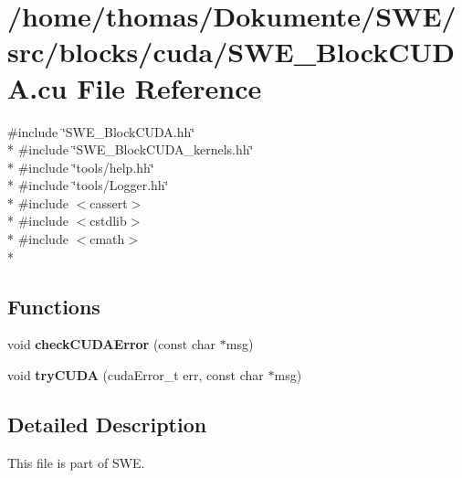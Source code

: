 \hypertarget{SWE__BlockCUDA_8cu}{\section{/home/thomas/\-Dokumente/\-S\-W\-E/src/blocks/cuda/\-S\-W\-E\-\_\-\-Block\-C\-U\-D\-A.cu File Reference}
\label{SWE__BlockCUDA_8cu}
}
{\ttfamily \#include \char`\"{}S\-W\-E\-\_\-\-Block\-C\-U\-D\-A.\-hh\char`\"{}}\\*
{\ttfamily \#include \char`\"{}S\-W\-E\-\_\-\-Block\-C\-U\-D\-A\-\_\-kernels.\-hh\char`\"{}}\\*
{\ttfamily \#include \char`\"{}tools/help.\-hh\char`\"{}}\\*
{\ttfamily \#include \char`\"{}tools/\-Logger.\-hh\char`\"{}}\\*
{\ttfamily \#include $<$cassert$>$}\\*
{\ttfamily \#include $<$cstdlib$>$}\\*
{\ttfamily \#include $<$cmath$>$}\\*
\subsection*{Functions}
\begin{DoxyCompactItemize}
\item 
\hypertarget{SWE__BlockCUDA_8cu_a3b360c7adecc62da0141b3c82e753c77}{void {\bfseries check\-C\-U\-D\-A\-Error} (const char $\ast$msg)}\label{SWE__BlockCUDA_8cu_a3b360c7adecc62da0141b3c82e753c77}

\item 
\hypertarget{SWE__BlockCUDA_8cu_a0cda924127c6de7246554ed6b80917e5}{void {\bfseries try\-C\-U\-D\-A} (cuda\-Error\-\_\-t err, const char $\ast$msg)}\label{SWE__BlockCUDA_8cu_a0cda924127c6de7246554ed6b80917e5}

\end{DoxyCompactItemize}


\subsection{Detailed Description}
This file is part of S\-W\-E.

